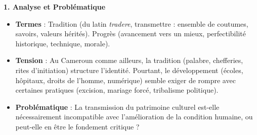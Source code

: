 \documentclass[11pt]{article}
\newcommand{\cle}[1]{{\popxbold\color{popdark}#1}}
\begin{document}
\begin{exoresolu}
    \textbf{1. Analyse et Problématique}
    \begin{itemize}
        \item \textbf{Termes} : \cle{Tradition} (du latin \emph{tradere}, transmettre : ensemble de coutumes, savoirs, valeurs hérités). \cle{Progrès} (avancement vers un mieux, perfectibilité historique, technique, morale).
        \item \textbf{Tension} : Au Cameroun comme ailleurs, la tradition (palabre, chefferies, rites d'initiation) structure l'identité. Pourtant, le \cle{développement} (écoles, hôpitaux, droits de l'homme, numérique) semble exiger de \guillemotleft rompre \guillemotright avec certaines pratiques (excision, mariage forcé, tribalisme politique).
        \item \textbf{Problématique} : \guillemotleft La transmission du patrimoine culturel est-elle nécessairement incompatible avec l'amélioration de la condition humaine, ou peut-elle en être le fondement critique ? \guillemotright
    \end{itemize}


\end{exoresolu}
\end{document}
